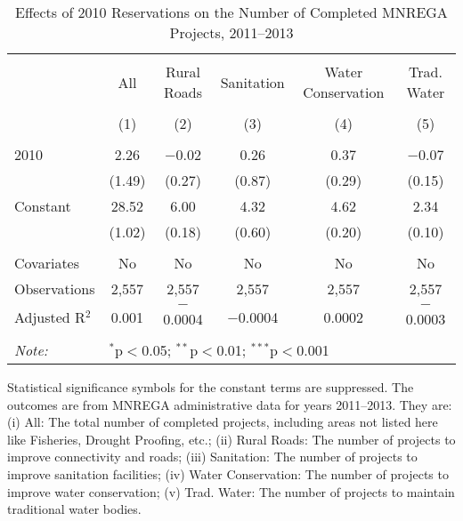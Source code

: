 \begin{table}[!htbp]
\centering
\begin{threeparttable}

  \caption{Effects of 2010 Reservations on the Number of Completed MNREGA Projects, 2011--2013} 
  \label{main_mnrega_10} 
\scriptsize 
\begin{tabular}{@{\extracolsep{0pt}}lccccc} 
\\[-1.8ex]\hline 
\hline \\[-1.8ex] 
 & All & Rural Roads & Sanitation & Water Conservation & Trad. Water \\ 
\\[-1.8ex] & (1) & (2) & (3) & (4) & (5)\\ 
\hline \\[-1.8ex] 
 2010 & 2.26 & $-$0.02 & 0.26 & 0.37 & $-$0.07 \\ 
  & (1.49) & (0.27) & (0.87) & (0.29) & (0.15) \\ 
  Constant & 28.52 & 6.00 & 4.32 & 4.62 & 2.34 \\ 
  & (1.02) & (0.18) & (0.60) & (0.20) & (0.10) \\ 
 \hline \\[-1.8ex] 
Covariates & No & No & No & No & No \\ 
Observations & 2,557 & 2,557 & 2,557 & 2,557 & 2,557 \\ 
Adjusted R$^{2}$ & 0.001 & $-$0.0004 & $-$0.0004 & 0.0002 & $-$0.0003 \\ 
\hline 
\hline \\[-1.8ex] 
\textit{Note:}  & \multicolumn{5}{l}{$^{*}$p$<$0.05; $^{**}$p$<$0.01; $^{***}$p$<$0.001} \\ 
\end{tabular} 
\begin{tablenotes}[flushleft]
\scriptsize
\item[] Statistical significance symbols for the constant terms are suppressed. The outcomes are from MNREGA administrative data for years 2011--2013. They are: 
(i) All: The total number of completed projects, including areas not listed here like Fisheries, Drought Proofing, etc.;
(ii) Rural Roads: The number of projects to improve connectivity and roads;
(iii) Sanitation: The number of projects to improve sanitation facilities;
(iv) Water Conservation: The number of projects to improve water conservation;
(v) Trad. Water: The number of projects to maintain traditional water bodies.
\end{tablenotes}
\end{threeparttable}
\end{table}
